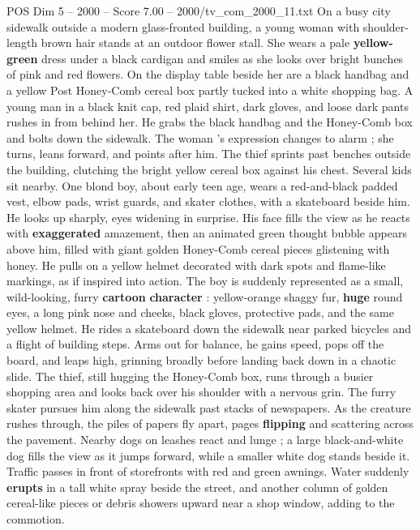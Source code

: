 \begin{textsample}{POS Dim 5 – 2000 – Score 7.00 – 2000/tv\_com\_2000\_11.txt}  \label{ex:f5_pos_029}
On a busy city sidewalk outside a modern glass-fronted building, a young woman with shoulder-length brown hair stands at an outdoor flower stall.
She wears a pale \textbf{yellow-green} dress under a black cardigan and smiles as she looks over bright bunches of pink and red flowers.
On the display table beside her are a black handbag and a yellow Post Honey-Comb cereal box partly tucked into a white shopping bag.
A young man in a black knit cap, red plaid shirt, dark gloves, and loose dark pants rushes in from behind her.
He grabs the black handbag and the Honey-Comb box and bolts down the sidewalk.
The woman ’s expression changes to alarm ; she turns, leans forward, and points after him.
The thief sprints past benches outside the building, clutching the bright yellow cereal box against his chest.
Several kids sit nearby.
One blond boy, about early teen age, wears a red-and-black padded vest, elbow pads, wrist guards, and skater clothes, with a skateboard beside him.
He looks up sharply, eyes widening in surprise.
His face fills the view as he reacts with \textbf{exaggerated} amazement, then an animated green thought bubble appears above him, filled with giant golden Honey-Comb cereal pieces glistening with honey.
He pulls on a yellow helmet decorated with dark spots and flame-like markings, as if inspired into action.
The boy is suddenly represented as a small, wild-looking, furry \textbf{cartoon} \textbf{character} : yellow-orange shaggy fur, \textbf{huge} round eyes, a long pink nose and cheeks, black gloves, protective pads, and the same yellow helmet.
He rides a skateboard down the sidewalk near parked bicycles and a flight of building steps.
Arms out for balance, he gains speed, pops off the board, and leaps high, grinning broadly before landing back down in a chaotic slide.
The thief, still hugging the Honey-Comb box, runs through a busier shopping area and looks back over his shoulder with a nervous grin.
The furry skater pursues him along the sidewalk past stacks of newspapers.
As the creature rushes through, the piles of papers fly apart, pages \textbf{flipping} and scattering across the pavement.
Nearby dogs on leashes react and lunge ; a large black-and-white dog fills the view as it jumps forward, while a smaller white dog stands beside it.
Traffic passes in front of storefronts with red and green awnings.
Water suddenly \textbf{erupts} in a tall white spray beside the street, and another column of golden cereal-like pieces or debris showers upward near a shop window, adding to the commotion.

\end{textsample}
